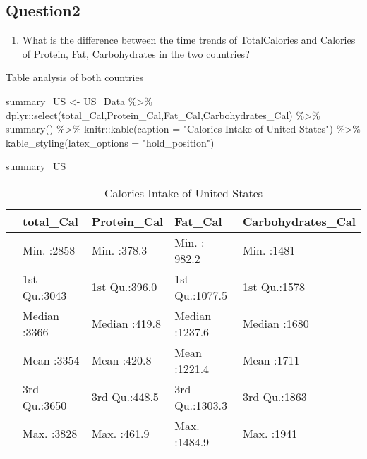 \documentclass[11pt,a4paper,]{article}
\newenvironment{Shaded}{\begin{snugshade}}{\end{snugshade}}
\newcommand{\AttributeTok}[1]{\textcolor[rgb]{0.77,0.63,0.00}{#1}}
\newcommand{\FunctionTok}[1]{\textcolor[rgb]{0.00,0.00,0.00}{#1}}
\newcommand{\NormalTok}[1]{#1}
\newcommand{\OtherTok}[1]{\textcolor[rgb]{0.56,0.35,0.01}{#1}}
\newcommand{\SpecialCharTok}[1]{\textcolor[rgb]{0.00,0.00,0.00}{#1}}
\newcommand{\StringTok}[1]{\textcolor[rgb]{0.31,0.60,0.02}{#1}}
\providecommand{\tightlist}{%
  \setlength{\itemsep}{0pt}\setlength{\parskip}{0pt}}
\begin{document}
\subsection*{Question2}

\begin{enumerate}
\def\labelenumi{(\arabic{enumi})}
\setcounter{enumi}{1}
\tightlist
\item
  What is the difference between the time trends of TotalCalories and Calories of Protein, Fat, Carbohydrates in the two countries?
\end{enumerate}

Table analysis of both countries

\begin{Shaded}
\begin{Highlighting}[]
\NormalTok{summary\_US }\OtherTok{\textless{}{-}}\NormalTok{ US\_Data }\SpecialCharTok{\%\textgreater{}\%} 
\NormalTok{  dplyr}\SpecialCharTok{::}\FunctionTok{select}\NormalTok{(total\_Cal,Protein\_Cal,Fat\_Cal,Carbohydrates\_Cal) }\SpecialCharTok{\%\textgreater{}\%}
  \FunctionTok{summary}\NormalTok{() }\SpecialCharTok{\%\textgreater{}\%} 
\NormalTok{  knitr}\SpecialCharTok{::}\FunctionTok{kable}\NormalTok{(}\AttributeTok{caption =} \StringTok{"Calories Intake of United States"}\NormalTok{) }\SpecialCharTok{\%\textgreater{}\%} 
         \FunctionTok{kable\_styling}\NormalTok{(}\AttributeTok{latex\_options =} \StringTok{"hold\_position"}\NormalTok{)}

\NormalTok{summary\_US}
\end{Highlighting}
\end{Shaded}

\begin{table}[!h]

\caption{\label{tab:US}Calories Intake of United States}
\centering
\begin{tabular}[t]{l|l|l|l|l}
\hline
  &   total\_Cal &  Protein\_Cal &    Fat\_Cal & Carbohydrates\_Cal\\
\hline
 & Min.   :2858 & Min.   :378.3 & Min.   : 982.2 & Min.   :1481\\
\hline
 & 1st Qu.:3043 & 1st Qu.:396.0 & 1st Qu.:1077.5 & 1st Qu.:1578\\
\hline
 & Median :3366 & Median :419.8 & Median :1237.6 & Median :1680\\
\hline
 & Mean   :3354 & Mean   :420.8 & Mean   :1221.4 & Mean   :1711\\
\hline
 & 3rd Qu.:3650 & 3rd Qu.:448.5 & 3rd Qu.:1303.3 & 3rd Qu.:1863\\
\hline
 & Max.   :3828 & Max.   :461.9 & Max.   :1484.9 & Max.   :1941\\
\hline
\end{tabular}
\end{table}
\end{document}
